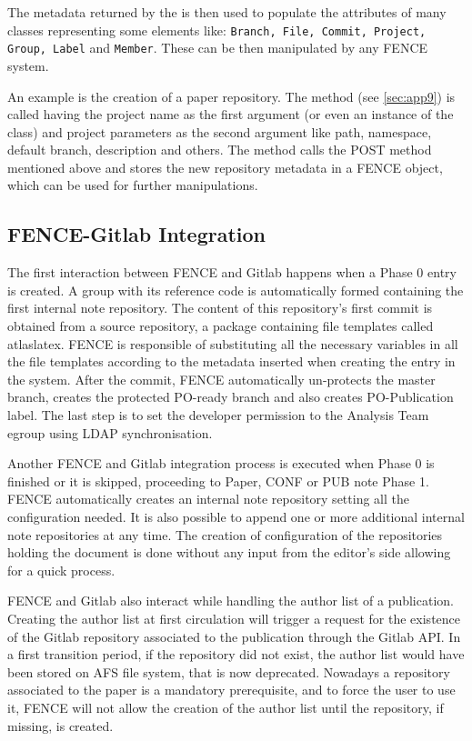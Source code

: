 The metadata returned by the  is then used to populate the attributes of many classes representing some \gitlab elements like: 
\texttt{Branch, File, Commit, Project, Group, Label} and \texttt{Member}.
These can be then manipulated by any FENCE system.

An example is the creation of a paper repository.
The  method (see \cref{sec:app9}) is called having the project name as the first argument (or even an instance of the  class) and project parameters as the second argument like path, namespace, default branch, description and others.
The method calls the POST method mentioned above and stores the new repository metadata in a FENCE  object, which can be used for further manipulations.


\subsection{FENCE-Gitlab Integration}%
\label{sec:FENCE-Gitlab_Integration}
The first interaction between FENCE and Gitlab happens when a Phase 0 entry is created. A group with its reference code is automatically formed containing the first internal note repository. The content of this repository’s first commit is obtained from a source repository, a package containing file templates called atlaslatex. FENCE is responsible of substituting all the necessary variables in all the file templates according to the metadata inserted when creating the entry in the system. After the commit, FENCE automatically un-protects the master branch, creates the protected PO-ready branch and also creates PO-Publication label. The last step is to set the developer permission to the Analysis Team egroup using LDAP synchronisation.
                    
Another FENCE and Gitlab integration process is executed when Phase 0 is finished or it is skipped, proceeding to Paper, CONF or PUB note Phase 1. FENCE automatically creates an internal note repository setting all the configuration needed. It is also possible to append one or more additional internal note repositories at any time. The creation of configuration of the repositories holding the document is done without any input from the editor’s side allowing for a quick process. 

FENCE and Gitlab also interact while handling the author list of a publication. Creating the author list at first circulation will trigger a request for the existence of the Gitlab repository associated to the publication through the Gitlab API\@.
In a first transition period, if the repository did not exist, the author list would have been stored on AFS file system, that is now deprecated.
Nowadays a \gitlab repository associated to the paper is a mandatory prerequisite, and to force the user to use it, FENCE will not allow the creation of the author list until the repository, if missing, is created.

